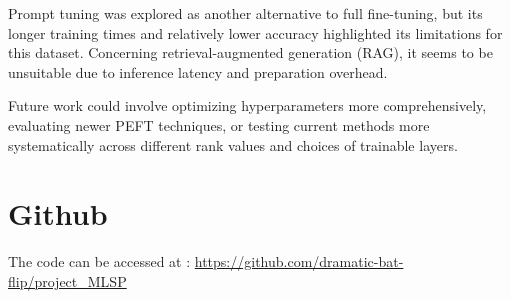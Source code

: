 \documentclass{article}
\begin{document}
Prompt tuning was explored as another alternative to full fine-tuning, but its longer training times and relatively lower accuracy highlighted its limitations for this dataset. Concerning retrieval-augmented generation (RAG), it seems to be unsuitable due to inference latency and preparation overhead.

Future work could involve optimizing hyperparameters more comprehensively, evaluating newer PEFT techniques, or testing current methods more systematically across different rank values and choices of trainable layers.



\vfill\pagebreak





\section{Github}

The code can be accessed at : \url{https://github.com/dramatic-bat-flip/project_MLSP}
\end{document}
